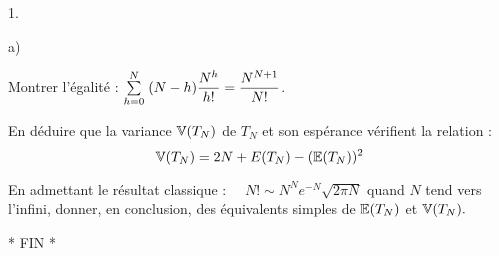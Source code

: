 \documentclass[11pt]{article}%
\begin{document}
\begin{noliste}{1.}
\begin{noliste}{a)}
\item Montrer l'égalité : \quad ${\textstyle\sum\limits_{h = 0}^{N}}\hspace{.1cm}(N-h)\dfrac{N^{h}}{h!} =
\dfrac{N^{N + 1}}{N!}$.

\item En déduire que la variance $\mathbb{V}(T_{N})$ de $T_{N}$ et son
espérance vérifient la relation :
\[
\mathbb{V}(T_{N}) = 2N + E(T_{N})-(\mathbb{E}(T_{N}))^{2}
\]
\end{noliste}

\item En admettant le résultat classique : $\quad N!\sim
N^{N}e^{-N}\sqrt{2\pi N}$ \quad quand $N$ tend vers l'infini, donner,
en conclusion, des équivalents simples de $\mathbb{E}(T_{N})$ et $\mathbb{V}(T_{N}).$
\end{noliste}

\begin{center}
{* FIN *}
\end{center}

\label{fin}
\end{document}

